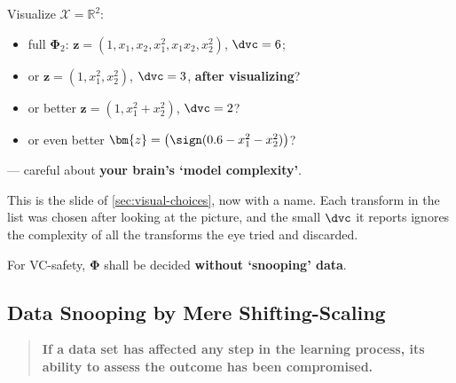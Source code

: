 \begin{center}
    \begin{minipage}[c]{0.64\textwidth}
        Visualize \(\mathcal{X} = \mathbb{R}^2\):
        \begin{itemize}
            \item full \(\bm{\Phi}_2\): \(\bm{z} = (1, x_1, x_2, x_1^2, x_1
                x_2, x_2^2)\), \(\dvc = 6\);
            \item or \(\bm{z} = (1, x_1^2, x_2^2)\), \(\dvc = 3\),
                \textbf{after visualizing}?
            \item or better \(\bm{z} = (1, x_1^2 + x_2^2)\), \(\dvc = 2\)?
            \item or even better \(\bm{z} = \bigl( \sign(0.6 - x_1^2 - x_2^2)
                \bigr)\)?
        \end{itemize}
        --- careful about \textbf{your brain's `model complexity'}.
    \end{minipage}%
    \hfill
    \begin{minipage}[c]{0.32\textwidth}
        \centering
    \end{minipage}
\end{center}

This is the slide of \autoref{sec:visual-choices}, now with a name. Each
transform in the list was chosen after looking at the picture, and the small
\(\dvc\) it reports ignores the complexity of all the transforms the eye
tried and discarded.

\begin{moral}
    For VC-safety, \(\bm{\Phi}\) shall be decided \textbf{without `snooping'
    data}.
\end{moral}

\subsection{Data Snooping by Mere Shifting-Scaling}

\begin{quote}
    \textbf{If a data set has affected any step in the learning process, its
    ability to assess the outcome has been compromised.}
\end{quote}

